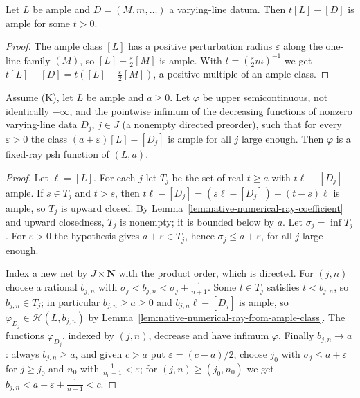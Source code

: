 \begin{lemma}
\label{lem:native-numerical-ray-coefficient}
\leanok
{}
Let $L$ be ample and $D=(M,m,\dots)$ a varying-line datum.  Then
$t[L]-[D]$ is ample for some $t>0$.
\end{lemma}
\begin{proof}
The ample class $[L]$ has a positive perturbation radius $\varepsilon$ along
the one-line family $(M)$, so $[L]-\frac\varepsilon2[M]$ is ample.  With
$t=(\frac\varepsilon2m)^{-1}$ we get
$t[L]-[D]=t([L]-\frac\varepsilon2[M])$, a positive multiple of an ample class.
\end{proof}

\begin{theorem}
\label{thm:native-numerical-psh-ray-net}
\leanok
{}
Assume (K), let $L$ be ample and $a\ge0$.  Let $\varphi$ be upper
semicontinuous, not identically $-\infty$, and the pointwise infimum of the
decreasing functions of nonzero varying-line data $D_j$, $j\in J$ (a nonempty
directed preorder), such that for every $\varepsilon>0$ the class
$(a+\varepsilon)[L]-[D_j]$ is ample for all $j$ large enough.  Then $\varphi$
is a fixed-ray psh function of $(L,a)$.
\end{theorem}
\begin{proof}
Let $\ell=[L]$.  For each $j$ let $T_j$ be the set of real $t\ge a$ with
$t\ell-[D_j]$ ample.  If $s\in T_j$ and $t>s$, then
$t\ell-[D_j]=(s\ell-[D_j])+(t-s)\ell$ is ample, so $T_j$ is upward closed.  By
Lemma~\ref{lem:native-numerical-ray-coefficient} and upward closedness, $T_j$
is nonempty; it is bounded below by $a$.  Let $\sigma_j=\inf T_j$.  For
$\varepsilon>0$ the hypothesis gives $a+\varepsilon\in T_j$, hence
$\sigma_j\le a+\varepsilon$, for all $j$ large enough.

Index a new net by $J\times\mathbf N$ with the product order, which is
directed.  For $(j,n)$ choose a rational $b_{j,n}$ with
$\sigma_j<b_{j,n}<\sigma_j+\frac1{n+1}$.  Some $t\in T_j$ satisfies
$t<b_{j,n}$, so $b_{j,n}\in T_j$; in particular $b_{j,n}\ge a\ge0$ and
$b_{j,n}\ell-[D_j]$ is ample, so $\varphi_{D_j}\in\mathcal H(L,b_{j,n})$ by
Lemma~\ref{lem:native-numerical-ray-from-ample-class}.  The functions
$\varphi_{D_j}$, indexed by $(j,n)$, decrease and have infimum $\varphi$.
Finally $b_{j,n}\to a$: always $b_{j,n}\ge a$, and given $c>a$ put
$\varepsilon=(c-a)/2$, choose $j_0$ with $\sigma_j\le a+\varepsilon$ for
$j\ge j_0$ and $n_0$ with $\frac1{n_0+1}<\varepsilon$; for
$(j,n)\ge(j_0,n_0)$ we get $b_{j,n}<a+\varepsilon+\frac1{n+1}<c$.
\end{proof}

